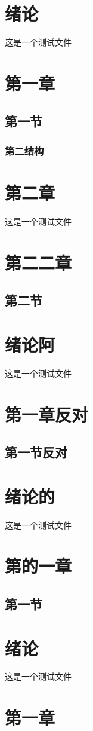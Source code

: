\section{绪论}
这是一个测试文件
\section{第一章}
\subsection{第一节}
\subsubsection{第二结构}
\section{第二章}
这是一个测试文件
\section{第二二章}
\subsection{第二节}
\section{绪论阿}
这是一个测试文件
\section{第一章反对}
\subsection{第一节反对}
\section{绪论的}
这是一个测试文件
\section{第的一章}
\subsection{第一节}
\section{绪论}
这是一个测试文件
\section{第一章}
